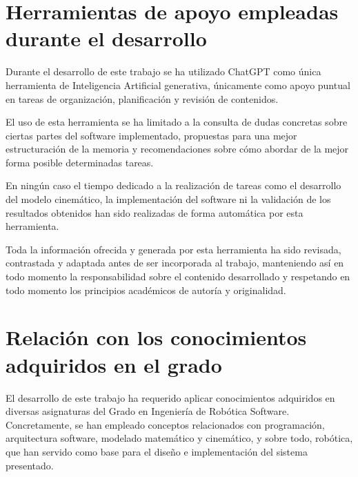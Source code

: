 \section{Herramientas de apoyo empleadas durante el desarrollo}
\label{sec:segundaseccion}

Durante el desarrollo de este trabajo se ha utilizado ChatGPT como única herramienta de Inteligencia Artificial generativa, únicamente como apoyo puntual en tareas de organización, planificación y revisión de contenidos.

\vspace{0.25cm}

El uso de esta herramienta se ha limitado a la consulta de dudas concretas sobre ciertas partes del software implementado, propuestas para una mejor estructuración de la memoria y recomendaciones sobre cómo abordar de la mejor forma posible determinadas tareas.

\vspace{0.25cm}

En ningún caso el tiempo dedicado a la realización de tareas como el desarrollo del modelo cinemático, la implementación del software ni la validación de los resultados obtenidos han sido realizadas de forma automática por esta herramienta.

\vspace{0.25cm}

Toda la información ofrecida y generada por esta herramienta ha sido revisada, contrastada y adaptada antes de ser incorporada al trabajo, manteniendo así en todo momento la responsabilidad sobre el contenido desarrollado y respetando en todo momento los principios académicos de autoría y originalidad.

\section{Relación con los conocimientos adquiridos en el grado}
\label{sec:segundaseccion}

El desarrollo de este trabajo ha requerido aplicar conocimientos adquiridos en diversas asignaturas del Grado en Ingeniería de Robótica Software. Concretamente, se han empleado conceptos relacionados con programación, arquitectura software, modelado matemático y cinemático, y sobre todo, robótica, que han servido como base para el diseño e implementación del sistema presentado.

